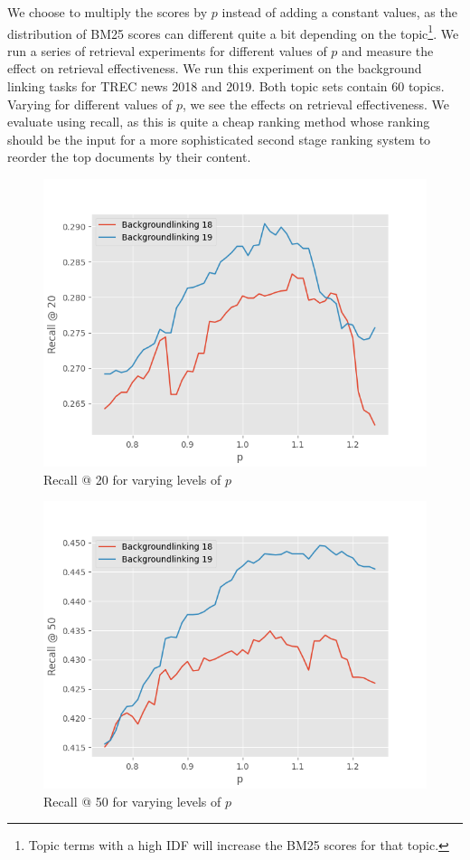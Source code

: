We choose to multiply the scores by $p$ instead of adding a constant values, as the distribution of BM25 scores can different quite a bit depending on the topic\footnote{Topic terms with a high IDF will increase the BM25 scores for that topic.}.
We run a series of retrieval experiments for different values of $p$ and measure the effect on retrieval effectiveness.  We run this experiment on the background linking tasks for TREC news 2018 and 2019. Both topic sets contain 60 topics. Varying for different values of $p$, we see the effects on retrieval effectiveness.  We evaluate using recall, as this is quite a cheap ranking method whose ranking should be the input for a more sophisticated second stage ranking system to reorder the top documents by their content.  

\begin{figure}
	\centering
	\includegraphics[width=0.9\linewidth]{./imgs/recall-20-geesedb.png}
	\caption{Recall @ 20 for varying levels of $p$}
	\label{geesedb-recall-20}
\end{figure}

\begin{figure}
	\centering
	\includegraphics[width=0.9\linewidth]{./imgs/recall-50-geesedb.png}
	\caption{Recall @ 50 for varying levels of $p$}
	\label{geesedb-recall-50}
\end{figure}

